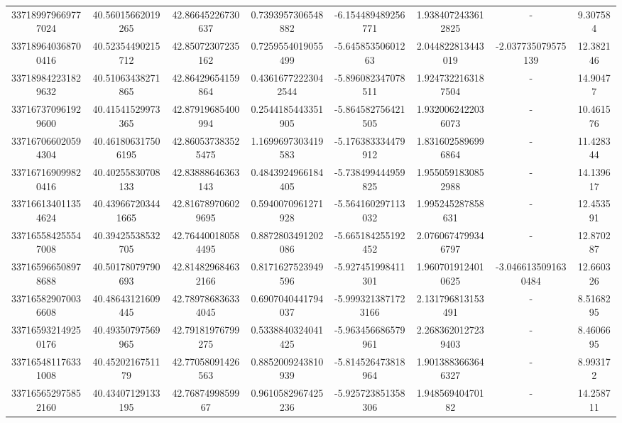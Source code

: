 \documentclass{article}
\begin{document}
\begin{landscape}
\begin{longtable}[c]{S[table-format=18.0]S[table-format=2.15]S[table-format=2.15]S[table-format=-2.17]S[table-format=-2.16]S[table-format=-2.16]S[table-format=-3.16]S[table-format=2.7]}
337189979669777024 & 40.56015662019265  & 42.86645226730637  & 0.7393957306548882    & -6.154489489256771  & 1.9384072433612825 & {-}                  & 9.307584   \\
337189640368700416 & 40.52354490215712  & 42.85072307235162  & 0.7259554019055499    & -5.64585350601263   & 2.044822813443019  & -2.037735079575139  & 12.382146  \\
337189842231829632 & 40.51063438271865  & 42.86429654159864  & 0.43616772223042544   & -5.896082347078511  & 1.9247322163187504 & {-}                  & 14.90477   \\
337167370961929600 & 40.41541529973365  & 42.87919685400994  & 0.2544185443351905    & -5.864582756421505  & 1.9320062422036073 & {-}                  & 10.461576  \\
337167066020594304 & 40.461806317506195 & 42.860537383525475 & 1.1699697303419583    & -5.176383334479912  & 1.8316025896996864 & {-}                  & 11.428344  \\
337167169099820416 & 40.40255830708133  & 42.83888646363143  & 0.4843924966184405    & -5.738499444959825  & 1.9550591830852988 & {-}                  & 14.139617  \\
337166134011354624 & 40.439667203441665 & 42.816789706029695 & 0.5940070961271928    & -5.564160297113032  & 1.995245287858631  & {-}                  & 12.453591  \\
337165584255547008 & 40.39425538532705  & 42.764400180584495 & 0.8872803491202086    & -5.665184255192452  & 2.0760674799346797 & {-}                  & 12.870287  \\
337165966508978688 & 40.50178079790693  & 42.814829684632166 & 0.8171627523949596    & -5.927451998411301  & 1.9607019124010625 & -3.0466135091630484 & 12.660326  \\
337165829070036608 & 40.48643121609445  & 42.789786836334045 & 0.6907040441794037    & -5.9993213871723166 & 2.131796813153491  & {-}                  & 8.5168295  \\
337165932149250176 & 40.49350797569965  & 42.79181976799275  & 0.5338840324041425    & -5.963456686579961  & 2.2683620127239403 & {-}                  & 8.4606695  \\
337165481176331008 & 40.4520216751179   & 42.77058091426563  & 0.8852009243810939    & -5.814526473818964  & 1.9013883663646327 & {-}                  & 8.993172   \\
337165652975852160 & 40.43407129133195  & 42.7687499859967   & 0.9610582967425236    & -5.925723851358306  & 1.94856940470182   & {-}                  & 14.258711  \\

\end{longtable}
\end{landscape}
\end{document}
